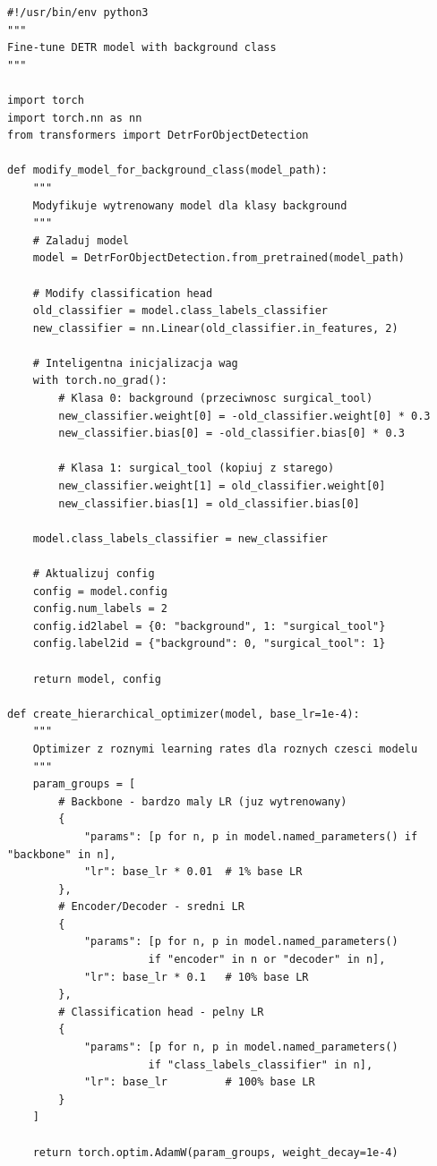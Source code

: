 \documentclass[12pt,a4paper]{article}
\begin{document}
\begin{lstlisting}[caption={Fine-tuning DETR z klasą background},label={lst:finetuning}]
#!/usr/bin/env python3
"""
Fine-tune DETR model with background class
"""

import torch
import torch.nn as nn
from transformers import DetrForObjectDetection

def modify_model_for_background_class(model_path):
    """
    Modyfikuje wytrenowany model dla klasy background
    """
    # Zaladuj model
    model = DetrForObjectDetection.from_pretrained(model_path)
    
    # Modify classification head
    old_classifier = model.class_labels_classifier
    new_classifier = nn.Linear(old_classifier.in_features, 2)
    
    # Inteligentna inicjalizacja wag
    with torch.no_grad():
        # Klasa 0: background (przeciwnosc surgical_tool)
        new_classifier.weight[0] = -old_classifier.weight[0] * 0.3
        new_classifier.bias[0] = -old_classifier.bias[0] * 0.3
        
        # Klasa 1: surgical_tool (kopiuj z starego)
        new_classifier.weight[1] = old_classifier.weight[0]
        new_classifier.bias[1] = old_classifier.bias[0]
    
    model.class_labels_classifier = new_classifier
    
    # Aktualizuj config
    config = model.config
    config.num_labels = 2
    config.id2label = {0: "background", 1: "surgical_tool"}
    config.label2id = {"background": 0, "surgical_tool": 1}
    
    return model, config

def create_hierarchical_optimizer(model, base_lr=1e-4):
    """
    Optimizer z roznymi learning rates dla roznych czesci modelu
    """
    param_groups = [
        # Backbone - bardzo maly LR (juz wytrenowany)
        {
            "params": [p for n, p in model.named_parameters() if "backbone" in n],
            "lr": base_lr * 0.01  # 1% base LR
        },
        # Encoder/Decoder - sredni LR
        {
            "params": [p for n, p in model.named_parameters() 
                      if "encoder" in n or "decoder" in n],
            "lr": base_lr * 0.1   # 10% base LR
        },
        # Classification head - pelny LR
        {
            "params": [p for n, p in model.named_parameters() 
                      if "class_labels_classifier" in n],
            "lr": base_lr         # 100% base LR
        }
    ]
    
    return torch.optim.AdamW(param_groups, weight_decay=1e-4)
\end{lstlisting}
\end{document}
